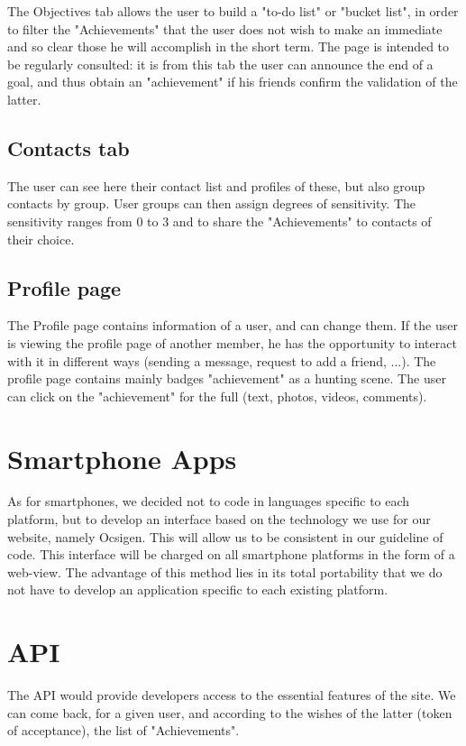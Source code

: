 \documentclass{life-fr}
\begin{document}
The Objectives tab allows the user to build a "to-do list" or "bucket list", in order to filter the "Achievements" that the user does not wish to make an immediate and so clear those he will accomplish in the short term. The page is intended to be regularly consulted: it is from this tab the user can announce the end of a goal, and thus obtain an "achievement" if his friends confirm the validation of the latter.

\subsection{Contacts tab}

The user can see here their contact list and profiles of these, but also group contacts by group. User groups can then assign degrees of sensitivity.
The sensitivity ranges from 0 to 3 and to share the "Achievements" to contacts of their choice.

\subsection{Profile page}

The Profile page contains information of a user, and can change them. If the user is viewing the profile page of another member, he has the opportunity to interact with it in different ways (sending a message, request to add a friend, ...).
The profile page contains mainly badges "achievement" as a hunting scene. The user can click on the "achievement" for the full (text, photos, videos, comments).

\section{Smartphone Apps}

As for smartphones, we decided not to code in languages specific to each platform, but to develop an interface based on the technology we use for our website, namely Ocsigen. This will allow us to be consistent in our guideline of code. This interface will be charged on all smartphone platforms in the form of a web-view. The advantage of this method lies in its total portability that we do not have to develop an application specific to each existing platform.

\section{API}

The API would provide developers access to the essential features of the site. We can come back, for a given user, and according to the wishes of the latter (token of acceptance), the list of "Achievements".
\end{document}
